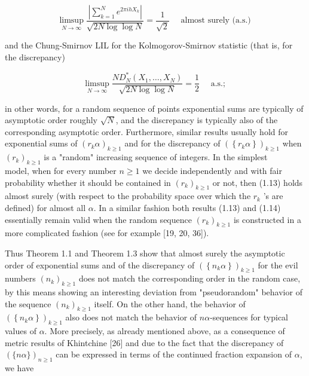 \documentclass[10pt]{article}
\begin{document}
\begin{equation*}
\limsup _{N \rightarrow \infty} \frac{\left|\sum_{k=1}^{N} e^{2 \pi i h X_{k}}\right|}{\sqrt{2 N \log \log N}}=\frac{1}{\sqrt{2}} \quad \text { almost surely (a.s.) } \tag{1.13}
\end{equation*}


and the Chung-Smirnov LIL for the Kolmogorov-Smirnov statistic (that is, for the discrepancy)


\begin{equation*}
\limsup _{N \rightarrow \infty} \frac{N D_{N}^{*}\left(X_{1}, \ldots, X_{N}\right)}{\sqrt{2 N \log \log N}}=\frac{1}{2} \quad \text { a.s.; } \tag{1.14}
\end{equation*}


in other words, for a random sequence of points exponential sums are typically of asymptotic order roughly $\sqrt{N}$, and the discrepancy is typically also of the corresponding asymptotic order. Furthermore, similar results usually hold for exponential sums of $\left(r_{k} \alpha\right)_{k \geqslant 1}$ and for the discrepancy of $\left(\left\{r_{k} \alpha\right\}\right)_{k \geqslant 1}$ when $\left(r_{k}\right)_{k \geqslant 1}$ is a "random" increasing sequence of integers. In the simplest\\
model, when for every number $n \geqslant 1$ we decide independently and with fair probability whether it should be contained in $\left(r_{k}\right)_{k \geqslant 1}$ or not, then (1.13) holds almost surely (with respect to the probability space over which the $r_{k}$ 's are defined) for almost all $\alpha$. In a similar fashion both results (1.13) and (1.14) essentially remain valid when the random sequence $\left(r_{k}\right)_{k \geqslant 1}$ is constructed in a more complicated fashion (see for example [19, 20, 36]).

Thus Theorem 1.1 and Theorem 1.3 show that almost surely the asymptotic order of exponential sums and of the discrepancy of $\left(\left\{n_{k} \alpha\right\}\right)_{k \geqslant 1}$ for the evil numbers $\left(n_{k}\right)_{k \geqslant 1}$ does not match the corresponding order in the random case, by this means showing an interesting deviation from "pseudorandom" behavior of the sequence $\left(n_{k}\right)_{k \geqslant 1}$ itself. On the other hand, the behavior of $\left(\left\{n_{k} \alpha\right\}\right)_{k \geqslant 1}$ also does not match the behavior of $n \alpha$-sequences for typical values of $\alpha$. More precisely, as already mentioned above, as a consequence of metric results of Khintchine [26] and due to the fact that the discrepancy of $(\{n \alpha\})_{n \geqslant 1}$ can be expressed in terms of the continued fraction expansion of $\alpha$, we have
\end{document}
